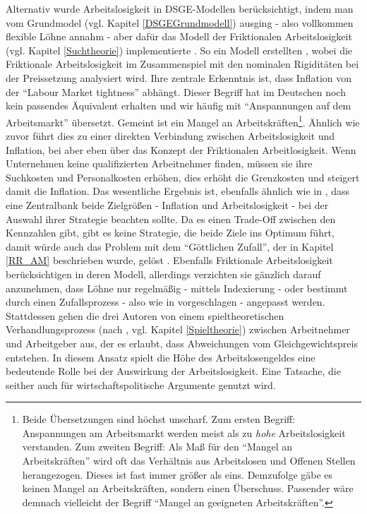 Alternativ wurde Arbeitslosigkeit in DSGE-Modellen berücksichtigt, indem man vom Grundmodel (vgl. Kapitel \ref{DSGEGrundmodell}) ausging - also vollkommen flexible Löhne annahm - aber dafür das Modell der Friktionalen Arbeitslosigkeit (vgl. Kapitel \ref{Suchtheorie}) implementierte \parencite{Pissarides2000}. So ein Modell erstellten \textcite{Blanchard2010}, wobei die Friktionale Arbeitslosigkeit im Zusammenspiel mit den nominalen Rigiditäten bei der Preissetzung analysiert wird. Ihre zentrale Erkenntnis ist, dass Inflation von der "`Labour Market tightness"' abhängt. Dieser Begriff hat im Deutschen noch kein passendes Äquivalent erhalten und wir häufig mit "`Anspannungen auf dem Arbeitsmarkt"' übersetzt. Gemeint ist ein Mangel an Arbeitskräften\footnote{Beide Übersetzungen sind höchst unscharf. Zum ersten Begriff: Anspannungen am Arbeitsmarkt werden meist als zu \textit{hohe} Arbeitslosigkeit verstanden. Zum zweiten Begriff: Als Maß für den "`Mangel an Arbeitskräften"' wird oft das Verhältnis aus Arbeitslosen und Offenen Stellen herangezogen. Dieses ist fast immer größer als eins. Demzufolge gäbe es keinen Mangel an Arbeitskräften, sondern einen Überschuss. Passender wäre demnach vielleicht der Begriff "`Mangel an geeigneten Arbeitskräften"'.}. Ähnlich wie zuvor \textcite{Gali2011a, Gali2011b} führt dies zu einer direkten Verbindung zwischen Arbeitslosigkeit und Inflation, bei \textcite[S. 15]{Blanchard2010} aber eben über das Konzept der Friktionalen Arbeitlosigkeit. Wenn Unternehmen keine qualifizierten Arbeitnehmer finden, müssen sie ihre Suchkosten und Personalkosten erhöhen, dies erhöht die Grenzkosten und steigert damit die Inflation. Das wesentliche Ergebnis ist, ebenfalls ähnlich wie in \textcite{Gali2011a, Gali2011b}, dass eine Zentralbank beide Zielgrößen - Inflation und Arbeitslosigkeit - bei der Auswahl ihrer Strategie beachten sollte. Da es einen Trade-Off zwischen den Kennzahlen gibt, gibt es keine Strategie, die beide Ziele ins Optimum führt, damit würde auch das Problem mit dem "`Göttlichen Zufall"', der in Kapitel \ref{RR_AM} beschrieben wurde, gelöst \parencite[S. 16]{Blanchard2010}. Ebenfalls Friktionale Arbeitslosigkeit berücksichtigen \textcite{Christiano2016} in deren Modell, allerdings verzichten sie gänzlich darauf anzunehmen, dass Löhne nur regelmäßig - mittels Indexierung - oder bestimmt durch einen Zufallsprozess - also wie in \textcite{Calvo1983} vorgeschlagen - angepasst werden. Stattdessen gehen die drei Autoren von einem spieltheoretischen Verhandlungsprozess (nach \textcite{Hall2008}, vgl. Kapitel \ref{Spieltheorie}) zwischen Arbeitnehmer und Arbeitgeber aus, der es erlaubt, dass Abweichungen vom Gleichgewichtspreis entstehen. In diesem Ansatz spielt die Höhe des Arbeitslosengeldes eine bedeutende Rolle bei der Auswirkung der Arbeitslosigkeit. Eine Tatsache, die seither auch für wirtschaftspolitische Argumente genutzt wird. 

